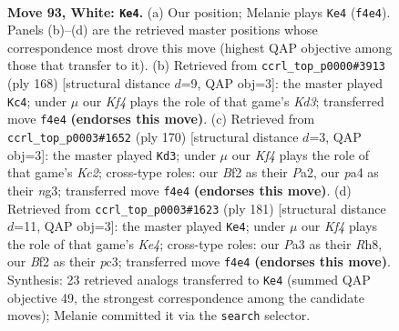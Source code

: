 \documentclass[11pt]{article}
\begin{document}
\clearpage

\begin{figure}[p]\centering
\begin{subfigure}{0.46\textwidth}\centering
\resizebox{\linewidth}{!}{%
\newchessgame
\chessboard[
  setfen={7k/3n4/8/5P2/p4K2/P6P/5B2/8 w - - 5 93},
  showmover=false,
  pgfstyle=straightmove, color=movearrow, markmove={f4-e4}
]}
\caption{}
\end{subfigure}\hfill
\begin{subfigure}{0.46\textwidth}\centering
\resizebox{\linewidth}{!}{%
\newchessgame
\chessboard[
  setfen={5k2/2p5/8/3nP2B/3P4/3K4/8/8 w - - 29 85},
  showmover=false,
  pgfstyle=straightmove, color=movearrow, markmove={d3-c4}
]}
\caption{}
\end{subfigure}
\\[4pt]
\begin{subfigure}{0.46\textwidth}\centering
\resizebox{\linewidth}{!}{%
\newchessgame
\chessboard[
  setfen={8/8/3k4/p7/8/2P3nB/P1K5/8 w - - 45 86},
  showmover=false,
  pgfstyle=straightmove, color=movearrow, markmove={c2-d3}
]}
\caption{}
\end{subfigure}\hfill
\begin{subfigure}{0.46\textwidth}\centering
\resizebox{\linewidth}{!}{%
\newchessgame
\chessboard[
  setfen={7r/8/8/3pk3/8/2P5/2N1K3/8 b - - 91 91},
  showmover=false,
  pgfstyle=straightmove, color=movearrow, markmove={e5-e4}
]}
\caption{}
\end{subfigure}
\caption{\textbf{Move 93, White: \texttt{Ke4}.} (a) Our position; Melanie plays \texttt{Ke4} (\texttt{f4e4}). Panels (b)--(d) are the retrieved master positions whose correspondence most drove this move (highest QAP objective among those that transfer to it). (b) Retrieved from \texttt{ccrl\_top\_p0000\#3913} (ply 168) [structural distance $d$=9, QAP obj=3]: the master played \texttt{Kc4}; under $\mu$ our \emph{Kf4} plays the role of that game's \emph{Kd3}; transferred move \texttt{f4e4} \textbf{(endorses this move)}. (c) Retrieved from \texttt{ccrl\_top\_p0003\#1652} (ply 170) [structural distance $d$=3, QAP obj=3]: the master played \texttt{Kd3}; under $\mu$ our \emph{Kf4} plays the role of that game's \emph{Kc2}; cross-type roles: our \emph{B}f2 as their \emph{P}a2, our \emph{p}a4 as their \emph{n}g3; transferred move \texttt{f4e4} \textbf{(endorses this move)}. (d) Retrieved from \texttt{ccrl\_top\_p0003\#1623} (ply 181) [structural distance $d$=11, QAP obj=3]: the master played \texttt{Ke4}; under $\mu$ our \emph{Kf4} plays the role of that game's \emph{Ke4}; cross-type roles: our \emph{P}a3 as their \emph{R}h8, our \emph{B}f2 as their \emph{p}c3; transferred move \texttt{f4e4} \textbf{(endorses this move)}. Synthesis: 23 retrieved analogs transferred to \texttt{Ke4} (summed QAP objective 49, the strongest correspondence among the candidate moves); Melanie committed it via the \texttt{search} selector.}
\label{fig:thought-m184}
\end{figure}
\end{document}
